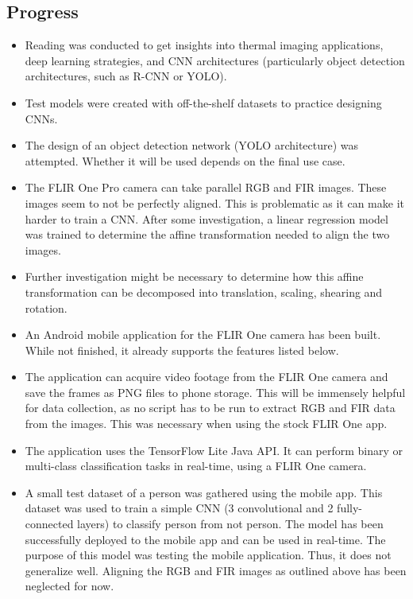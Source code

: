 \documentclass[11pt]{article}
\begin{document}
\subsection{Progress}\label{progress}

\begin{itemize}
    \item Reading was conducted to get insights into thermal imaging applications, deep learning strategies, and CNN architectures (particularly object detection architectures, such as R-CNN or YOLO).
    \item Test models were created with off-the-shelf datasets to practice designing CNNs.
    \item The design of an object detection network (YOLO architecture) was attempted. Whether it will be used depends on the final use case.
    \item The FLIR One Pro camera can take parallel RGB and FIR images. These images seem to not be perfectly aligned. This is problematic as it can make it harder to train a CNN. After some investigation, a linear regression model was trained to determine the affine transformation needed to align the two images.
    \item Further investigation might be necessary to determine how this affine transformation can be decomposed into translation, scaling, shearing and rotation.
    \item An Android mobile application for the FLIR One camera has been built. While not finished, it already supports the features listed below.
    \item The application can acquire video footage from the FLIR One camera and save the frames as PNG files to phone storage. This will be immensely helpful for data collection, as no script has to be run to extract RGB and FIR data from the images. This was necessary when using the stock FLIR One app.
    \item The application uses the TensorFlow Lite Java API. It can perform binary or multi-class classification tasks in real-time, using a FLIR One camera.
    \item A small test dataset of a person was gathered using the mobile app. This dataset was used to train a simple CNN (3 convolutional and 2 fully-connected layers) to classify person from not person. The model has been successfully deployed to the mobile app and can be used in real-time. The purpose of this model was testing the mobile application. Thus, it does not generalize well. Aligning the RGB and FIR images as outlined above has been neglected for now.
\end{itemize}
\end{document}
